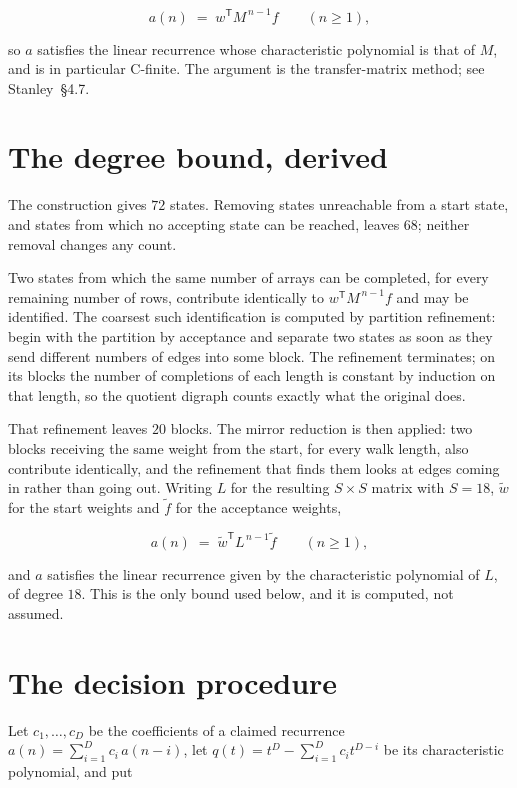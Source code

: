 \documentclass[11pt]{article}
\theoremstyle{definition}
\begin{document}
\[a(n) \;=\; w^{\mathsf T} M^{\,n-1} f \qquad (n \ge 1),\]

so $a$ satisfies the linear recurrence whose characteristic polynomial is that of $M$, and is in particular C-finite. The argument is the transfer-matrix method; see Stanley~\S4.7.

\section{The degree bound, derived}

The construction gives $72$ states. Removing states unreachable from a start state, and states from which no accepting state can be reached, leaves $68$; neither removal changes any count.

Two states from which the same number of arrays can be completed, for every remaining number of rows, contribute identically to $w^{\mathsf T}M^{\,n-1}f$ and may be identified. The coarsest such identification is computed by partition refinement: begin with the partition by acceptance and separate two states as soon as they send different numbers of edges into some block. The refinement terminates; on its blocks the number of completions of each length is constant by induction on that length, so the quotient digraph counts exactly what the original does.

That refinement leaves $20$ blocks. The mirror reduction is then applied: two blocks receiving the same weight from the start, for every walk length, also contribute identically, and the refinement that finds them looks at edges coming in rather than going out. Writing $L$ for the resulting $S \times S$ matrix with $S = 18$, $\tilde w$ for the start weights and $\tilde f$ for the acceptance weights,

\[a(n) \;=\; \tilde w^{\mathsf T} L^{\,n-1} \tilde f \qquad (n \ge 1),\]

and $a$ satisfies the linear recurrence given by the characteristic polynomial of $L$, of degree $18$. This is the only bound used below, and it is computed, not assumed.

\section{The decision procedure}

Let $c_1,\dots,c_D$ be the coefficients of a claimed recurrence $a(n) = \sum_{i=1}^{D} c_i\,a(n-i)$, let $q(t) = t^{D} - \sum_{i=1}^{D} c_i t^{D-i}$ be its characteristic polynomial, and put
\end{document}

